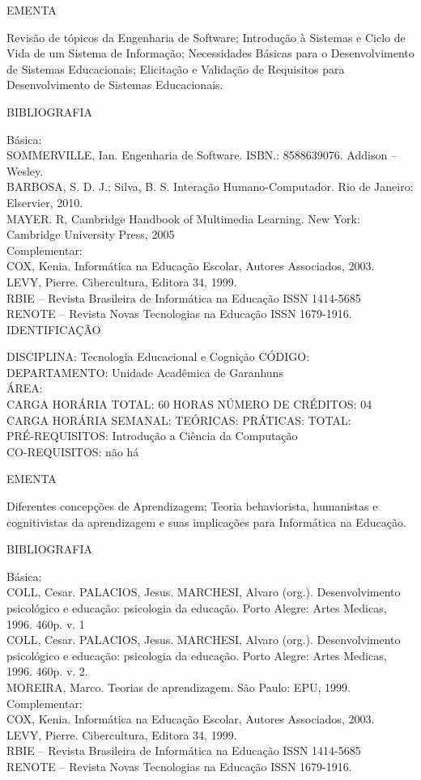 \documentclass[
	12pt,				%
	openright,			%
  oneside,     %
	a4paper,			%
	chapter=TITLE,		%
	english,			%
	french,				%
	spanish,			%
	brazil				%
	]{abntex2}
\begin{document}
\begin{apendicesenv}
EMENTA 

Revisão de tópicos da Engenharia de Software; Introdução à
Sistemas e Ciclo de Vida de um Sistema de Informação;  
Necessidades Básicas para o Desenvolvimento de Sistemas Educacionais; Elicitação e Validação de Requisitos para Desenvolvimento de
Sistemas Educacionais.

BIBLIOGRAFIA 

Básica:\\
SOMMERVILLE, Ian. Engenharia de Software. ISBN.: 8588639076. Addison --
Wesley.\\
BARBOSA, S. D. J.; Silva, B. S. Interação Humano-Computador. Rio de
Janeiro: Elservier, 2010.\\
MAYER. R, Cambridge Handbook of Multimedia Learning. New York: Cambridge
University Press, 2005\\
Complementar:\\
COX, Kenia. Informática na Educação Escolar, Autores Associados, 2003.\\
LEVY, Pierre. Cibercultura, Editora 34, 1999.\\
RBIE -- Revista Brasileira de Informática na Educação ISSN 1414-5685\\
RENOTE -- Revista Novas Tecnologias na Educação ISSN 1679-1916.\\

\newpage IDENTIFICAÇÃO

DISCIPLINA: Tecnologia Educacional e Cognição CÓDIGO:\\ 
DEPARTAMENTO: Unidade Acadêmica de Garanhuns\\
ÁREA: \\
CARGA HORÁRIA TOTAL: 60 HORAS NÚMERO DE CRÉDITOS: 04\\
CARGA HORÁRIA SEMANAL: TEÓRICAS: PRÁTICAS: TOTAL: \\
PRÉ-REQUISITOS: Introdução a Ciência da Computação\\
CO-REQUISITOS: não há

EMENTA 

Diferentes concepções de Aprendizagem; Teoria behaviorista, humanistas e
cognitivistas da aprendizagem e suas implicações para Informática na
Educação.

BIBLIOGRAFIA 

Básica:\\
COLL, Cesar. PALACIOS, Jesus. MARCHESI, Alvaro (org.). Desenvolvimento
psicológico e educação: psicologia da educação. Porto Alegre: Artes
Medicas, 1996. 460p. v. 1\\
COLL, Cesar. PALACIOS, Jesus. MARCHESI, Alvaro (org.). Desenvolvimento
psicológico e educação: psicologia da educação. Porto Alegre: Artes
Medicas, 1996. 460p. v. 2.\\
MOREIRA, Marco. Teorias de aprendizagem. São Paulo: EPU, 1999.\\
Complementar:\\
COX, Kenia. Informática na Educação Escolar, Autores Associados, 2003.\\
LEVY, Pierre. Cibercultura, Editora 34, 1999.\\
RBIE -- Revista Brasileira de Informática na Educação ISSN 1414-5685\\
RENOTE -- Revista Novas Tecnologias na Educação ISSN 1679-1916.


\end{apendicesenv}
\end{document}
